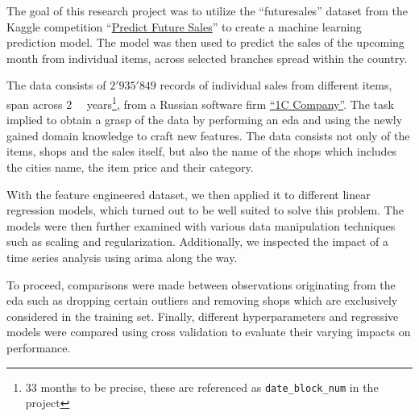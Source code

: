 The goal of this research project was to utilize the \enquote{\gls{futuresales}} dataset from the Kaggle competition \enquote{\href{https://www.kaggle.com/c/competitive-data-science-predict-future-sales}{Predict Future Sales}} to create a machine learning prediction model.
The model was then used to predict the sales of the upcoming month from individual items, across selected branches spread within the country.

The data consists of $2'935'849$ records of individual sales from different items, span across \mbox{2 \textonehalf} \ years\footnote{33 months to be precise, these are referenced as \texttt{date\_block\_num} in the project}, from a Russian software firm \href{https://1c.ru/eng/title.htm}{\enquote{1C Company}}.
The task implied to obtain a grasp of the data by performing an \acrfull{eda} and using the newly gained domain knowledge to craft new features.
The data consists not only of the items, shops and the sales itself, but also the name of the shops which includes the cities name, the item price and their category.

With the feature engineered dataset, we then applied it to different linear regression models, which turned out to be well suited to solve this problem.
The models were then further examined with various data manipulation techniques such as scaling and regularization.
Additionally, we inspected the impact of a time series analysis using \acrshort{arima} along the way.

To proceed, comparisons were made between observations originating from the \acrshort{eda} such as dropping certain outliers and removing shops which are exclusively considered in the training set.
Finally, different \glspl{hyperparameter} and regressive models were compared using cross validation to evaluate their varying impacts on performance.
